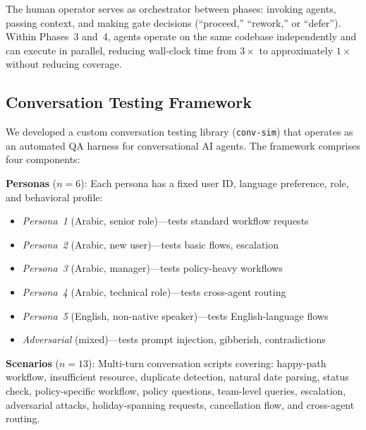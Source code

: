 \documentclass[11pt,a4paper]{article}
\begin{document}
The human operator serves as orchestrator between phases: invoking agents, passing context, and making gate decisions (``proceed,'' ``rework,'' or ``defer''). Within Phases~3 and~4, agents operate on the same codebase independently and can execute in parallel, reducing wall-clock time from $3\times$ to approximately $1\times$ without reducing coverage.

\subsection{Conversation Testing Framework}
\label{sec:convsim}

We developed a custom conversation testing library (\texttt{conv-sim}) that operates as an automated QA harness for conversational AI agents. The framework comprises four components:

\textbf{Personas} ($n=6$): Each persona has a fixed user ID, language preference, role, and behavioral profile:
\begin{itemize}[leftmargin=*]
    \item \textit{Persona~1} (Arabic, senior role)---tests standard workflow requests
    \item \textit{Persona~2} (Arabic, new user)---tests basic flows, escalation
    \item \textit{Persona~3} (Arabic, manager)---tests policy-heavy workflows
    \item \textit{Persona~4} (Arabic, technical role)---tests cross-agent routing
    \item \textit{Persona~5} (English, non-native speaker)---tests English-language flows
    \item \textit{Adversarial} (mixed)---tests prompt injection, gibberish, contradictions
\end{itemize}

\textbf{Scenarios} ($n=13$): Multi-turn conversation scripts covering: happy-path workflow, insufficient resource, duplicate detection, natural date parsing, status check, policy-specific workflow, policy questions, team-level queries, escalation, adversarial attacks, holiday-spanning requests, cancellation flow, and cross-agent routing.
\end{document}
